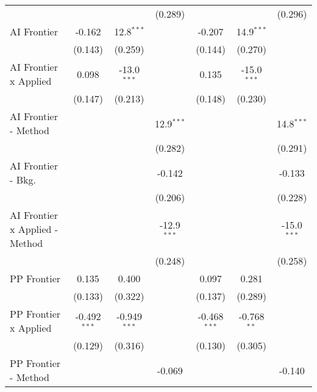 \begin{tabular}{lcccccc}
                                  &                &                & (0.289)       &                &                & (0.296)\\   
   AI Frontier                    & -0.162         & 12.8$^{***}$   &               & -0.207         & 14.9$^{***}$   &   \\   
                                  & (0.143)        & (0.259)        &               & (0.144)        & (0.270)        &   \\   
   AI Frontier x Applied          & 0.098          & -13.0$^{***}$  &               & 0.135          & -15.0$^{***}$  &   \\   
                                  & (0.147)        & (0.213)        &               & (0.148)        & (0.230)        &   \\   
   AI Frontier - Method           &                &                & 12.9$^{***}$  &                &                & 14.8$^{***}$\\   
                                  &                &                & (0.282)       &                &                & (0.291)\\   
   AI Frontier - Bkg.             &                &                & -0.142        &                &                & -0.133\\   
                                  &                &                & (0.206)       &                &                & (0.228)\\   
   AI Frontier x Applied - Method &                &                & -12.9$^{***}$ &                &                & -15.0$^{***}$\\   
                                  &                &                & (0.248)       &                &                & (0.258)\\   
   PP Frontier                    & 0.135          & 0.400          &               & 0.097          & 0.281          &   \\   
                                  & (0.133)        & (0.322)        &               & (0.137)        & (0.289)        &   \\   
   PP Frontier x Applied          & -0.492$^{***}$ & -0.949$^{***}$ &               & -0.468$^{***}$ & -0.768$^{**}$  &   \\   
                                  & (0.129)        & (0.316)        &               & (0.130)        & (0.305)        &   \\   
   PP Frontier - Method           &                &                & -0.069        &                &                & -0.140\\   

\end{tabular}
